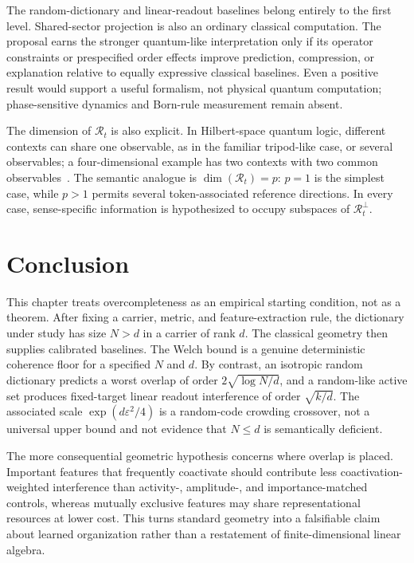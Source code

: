\documentclass[
  aps,
  reprint,
  superscriptaddress,
  floatfix,
  nofootinbib,
  longbibliography
]{revtex4-2}
\begin{document}
The random-dictionary and linear-readout baselines belong entirely to the first
level.  Shared-sector projection is also an ordinary classical computation.
The proposal earns the stronger quantum-like interpretation only if its
operator constraints or prespecified order effects improve prediction,
compression, or explanation relative to equally expressive classical
baselines.  Even a positive result would support a useful formalism, not
physical quantum computation; phase-sensitive dynamics and Born-rule
measurement remain absent.

The dimension of $\mathcal R_t$ is also explicit. In Hilbert-space quantum
logic, different contexts can share one observable, as in the familiar
tripod-like case, or several observables; a four-dimensional example has
two contexts with two common observables~\cite{svozil:040102}. The semantic
analogue is $\dim(\mathcal R_t)=p$: $p=1$ is the simplest case, while
$p>1$ permits several token-associated reference directions. In every case,
sense-specific information is hypothesized to occupy subspaces of
$\mathcal R_t^\perp$.

\section{Conclusion}
\label{sec:conclusion}

This chapter treats overcompleteness as an empirical starting condition, not
as a theorem.  After fixing a carrier, metric, and feature-extraction rule, the
dictionary under study has size $N>d$ in a carrier of rank $d$.  The classical
geometry then supplies calibrated baselines.  The Welch bound is a genuine
deterministic coherence floor for a specified $N$ and $d$.  By contrast, an
isotropic random dictionary predicts a worst overlap of order
$2\sqrt{\log N/d}$, and a random-like active set produces fixed-target linear
readout interference of order $\sqrt{k/d}$.  The associated scale
$\exp(d\varepsilon^2/4)$ is a random-code crowding crossover, not a universal
upper bound and not evidence that $N\le d$ is semantically deficient.

The more consequential geometric hypothesis concerns where overlap is placed.
Important features that frequently coactivate should contribute less
coactivation-weighted interference than activity-, amplitude-, and
importance-matched controls, whereas mutually exclusive features may share
representational resources at lower cost.  This turns standard geometry into
a falsifiable claim about learned organization rather than a restatement of
finite-dimensional linear algebra.
\end{document}
